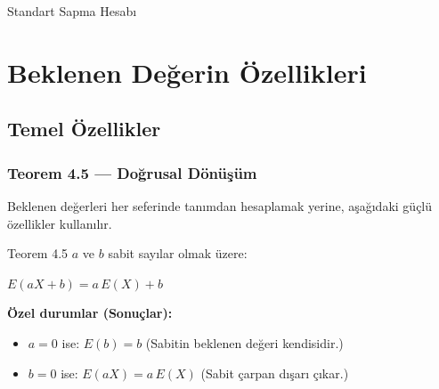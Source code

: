 \documentclass[light]{lutbeamer}
\begin{document}
\begin{frame}{Standart Sapma Hesabı}
\end{frame}

\section{Beklenen Değerin Özellikleri}
\subsection{Temel Özellikler}

\begin{frame}[fragile]
  \frametitle{Teorem 4.5 --- Doğrusal Dönüşüm}
  Beklenen değerleri her seferinde tanımdan hesaplamak yerine, aşağıdaki güçlü özellikler kullanılır.
  \begin{center}
    \begin{minipage}{0.9\textwidth}
      \begin{block}{Teorem 4.5}
        $a$ ve $b$ sabit sayılar olmak üzere:
        \begin{center}
          $E(aX + b) = a\,E(X) + b$
        \end{center}
      \end{block}
    \end{minipage}
  \end{center}

  \medskip
  \textbf{Özel durumlar (Sonuçlar):}
  \begin{itemize}
    \item $a = 0$ ise: $E(b) = b$ \quad (Sabitin beklenen değeri kendisidir.)
    \item $b = 0$ ise: $E(aX) = a\,E(X)$ \quad (Sabit çarpan dışarı çıkar.)
  \end{itemize}
\end{frame}
\end{document}
